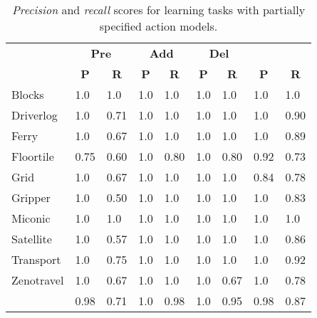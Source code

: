 \documentclass[3p,times]{elsarticle}
\begin{document}
\begin{table}[hbt!]
\begin{footnotesize}
	\begin{center}
		
		\begin{tabular}{l|l|l|l|l|l|l||l|l|}
			 & \multicolumn{2}{|c|}{\bf Pre} & \multicolumn{2}{|c|}{\bf Add} & \multicolumn{2}{|c||}{\bf Del} & \multicolumn{2}{|c}{\bf}\\ \cline{2-9}			
			  & \multicolumn{1}{|c|}{\bf P} & \multicolumn{1}{|c|}{\bf R} & \multicolumn{1}{|c|}{\bf P} & \multicolumn{1}{|c|}{\bf R} & \multicolumn{1}{|c|}{\bf P} & \multicolumn{1}{|c||}{\bf R} &  \multicolumn{1}{|c|}{\bf P} & \multicolumn{1}{|c|}{\bf R} \\
			\hline
				Blocks & 1.0 & 1.0 & 1.0 & 1.0 & 1.0 & 1.0 & 1.0 & 1.0 \\
				Driverlog & 1.0 & 0.71 & 1.0 & 1.0 & 1.0 & 1.0 & 1.0 & 0.90 \\
				Ferry & 1.0 & 0.67 & 1.0 & 1.0 & 1.0 & 1.0 & 1.0 & 0.89 \\
				Floortile & 0.75 & 0.60 & 1.0 & 0.80 & 1.0 & 0.80 & 0.92 & 0.73 \\
                Grid & 1.0 & 0.67 & 1.0 & 1.0 & 1.0 & 1.0 & 0.84 & 0.78 \\
				Gripper & 1.0 & 0.50 & 1.0 & 1.0 & 1.0 & 1.0 & 1.0 & 0.83 \\
				Miconic & 1.0 & 1.0 & 1.0 & 1.0 & 1.0 & 1.0 & 1.0 & 1.0 \\
				Satellite & 1.0 & 0.57 & 1.0 & 1.0 & 1.0 & 1.0 & 1.0 & 0.86 \\
				Transport & 1.0 & 0.75 & 1.0 & 1.0 & 1.0 & 1.0 & 1.0 & 0.92 \\
				Zenotravel & 1.0 & 0.67 & 1.0 & 1.0 & 1.0 & 0.67 & 1.0 & 0.78 \\
				\hline
				\bf  & 0.98 & 0.71 & 1.0 & 0.98 & 1.0 & 0.95 & 0.98 & 0.87 \\
			\end{tabular}
		
	\end{center}
\end{footnotesize}
\caption{\small {\em Precision} and {\em recall} scores for learning tasks with partially specified action models.}
\label{tab:results_plans_partial}
\end{table}
\end{document}
